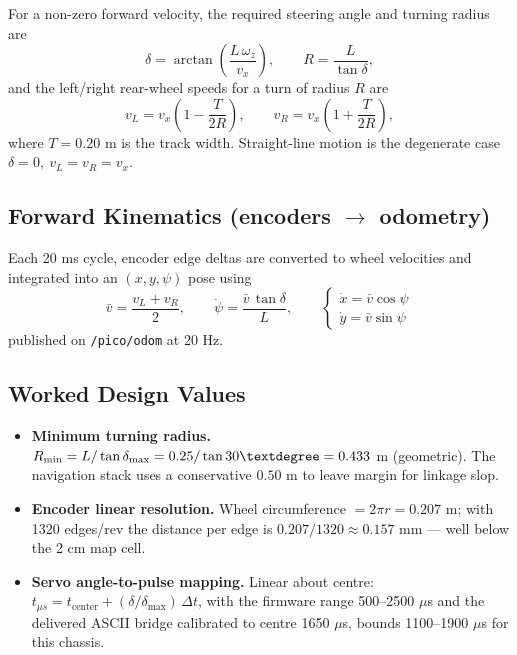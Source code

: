 \documentclass[12pt,a4paper]{report}
\begin{document}
For a non-zero forward velocity, the required steering angle and turning radius
are
\begin{equation}
\delta = \arctan\!\left(\frac{L\,\omega_z}{v_x}\right),
\qquad
R = \frac{L}{\tan \delta},
\end{equation}
and the left/right rear-wheel speeds for a turn of radius $R$ are
\begin{equation}
v_{L} = v_x\left(1 - \frac{T}{2R}\right),
\qquad
v_{R} = v_x\left(1 + \frac{T}{2R}\right),
\end{equation}
where $T = 0.20$ m is the track width. Straight-line motion is the degenerate
case $\delta = 0,\ v_L = v_R = v_x$.

\subsection{Forward Kinematics (encoders $\rightarrow$ odometry)}

Each 20 ms cycle, encoder edge deltas are converted to wheel velocities and
integrated into an $(x, y, \psi)$ pose using
\begin{equation}
\bar{v} = \frac{v_L + v_R}{2},
\qquad
\dot{\psi} = \frac{\bar{v}\,\tan\delta}{L},
\qquad
\begin{cases}
\dot{x} = \bar{v}\cos\psi \\
\dot{y} = \bar{v}\sin\psi
\end{cases}
\end{equation}
published on \texttt{/pico/odom} at 20 Hz.

\subsection{Worked Design Values}

\begin{itemize}[leftmargin=1.4cm]
    \item \textbf{Minimum turning radius.}
          $R_{\min} = L / \tan\delta_{\max} = 0.25 / \tan 30\textdegree
          = 0.433$ m (geometric). The navigation stack uses a conservative
          $0.50$ m to leave margin for linkage slop.
    \item \textbf{Encoder linear resolution.} Wheel circumference
          $= 2\pi r = 0.207$ m; with 1320 edges/rev the distance per edge is
          $0.207 / 1320 \approx 0.157$ mm --- well below the 2 cm map cell.
    \item \textbf{Servo angle-to-pulse mapping.} Linear about centre:
          $t_{\mu s} = t_{\text{center}} + (\delta / \delta_{\max})\,\Delta t$,
          with the firmware range 500--2500 $\mu$s and the delivered ASCII bridge
          calibrated to centre 1650 $\mu$s, bounds 1100--1900 $\mu$s for this
          chassis.
\end{itemize}
\end{document}
